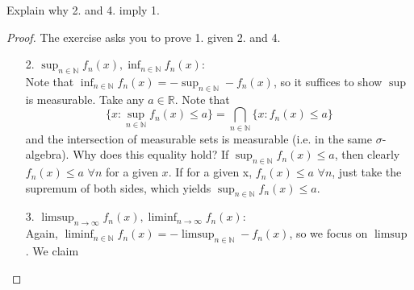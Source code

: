 \documentclass[11pt]{scrartcl}
\begin{document}
\begin{exercise}
Explain why 2. and 4. imply 1.
\end{exercise}

\begin{proof} The exercise asks you to prove 1. given 2. and 4.
\begin{itemize}
\item[2.] $\sup_{n\in \mathbb{N}} f_n(x), \inf_{n\in \mathbb{N}} f_n(x)$: \\
Note that $\inf_{n\in \mathbb{N}} f_n(x) = - \sup_{n\in \mathbb{N}}  - f_n(x)$, so it suffices to show $\sup$ is measurable. Take any $a \in \mathbb{R}$. Note that 
$$\{x: \sup_{n\in \mathbb{N}} f_n(x) \leq a\} = \bigcap_{n\in \mathbb{N}} \{x: f_n(x) \leq a\} $$
and the intersection of measurable sets is measurable (i.e. in the same $\sigma$-algebra). Why does this equality hold? If $\sup_{n\in \mathbb{N}} f_n(x) \leq a$, then clearly $f_n(x) \leq a$ $\forall n$ for a given $x$. If for a given x, $f_n(x) \leq a$ $\forall n$, just take the supremum of both sides, which yields $\sup_{n\in \mathbb{N}} f_n(x) \leq a$.
\item[3.] $\limsup_{n\rightarrow \infty} f_n(x), \liminf_{n\rightarrow \infty} f_n(x)$:\\
Again, $\liminf_{n\in \mathbb{N}} f_n(x) = - \limsup_{n\in \mathbb{N}}  - f_n(x)$, so we focus on $\limsup$. We claim


\end{itemize}
\end{proof}
\end{document}
